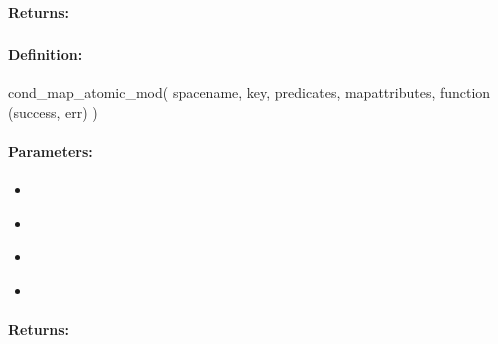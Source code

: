 \paragraph{Returns:}


\pagebreak
\subsubsection{}
\label{api:nodejs:cond_map_atomic_mod}


\paragraph{Definition:}
\begin{javascriptcode}
cond_map_atomic_mod(
        spacename, key, predicates, mapattributes, function (success, err) {})
\end{javascriptcode}
\paragraph{Parameters:}
\begin{itemize}[noitemsep]
\item {}\\

\item {}\\

\item {}\\

\item {}\\

\end{itemize}

\paragraph{Returns:}


\pagebreak
\subsubsection{}
\label{api:nodejs:map_atomic_and}


